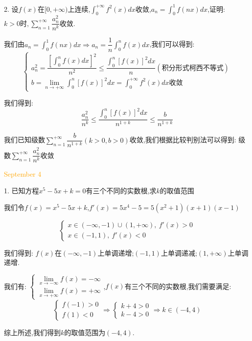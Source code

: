 2. 设$f(x)$在$[0,+\infty)$上连续,$\int_{0}^{+\infty}f^{2}(x)dx$收敛,$a_{n}=\int_{0}^{1}f(nx)dx$,证明:  $k>0\text{时},\sum\limits_{n=1}^{+\infty}\dfrac{a_{n}^2}{n^k}$收敛.
\begin{solution}

	我们由$a_{n}=\int_{0}^{1}f(nx)dx\Rightarrow a_{n}=\dfrac{1}{n}\int_{0}^{n}f(x)dx$,我们可以得到:  
	$$\left\lbrace
	\begin{array}{l}
		a_{n}^2=\dfrac{[\int_{0}^{n}f(x)dx]^2}{n^2}\leq \dfrac{\int_{0}^{n}[f(x)]^2dx}{n}(\text{积分形式柯西不等式})\\
		b=\lim\limits_{n\to+\infty}\int_{0}^{n}[f(x)]^2dx=\int_{0}^{+\infty}f^{2}(x)dx\text{收敛}
	\end{array}
	\right. $$
	
	我们得到:  $$\dfrac{a_{n}^2}{n^{k}}\leq \dfrac{\int_{0}^{n}[f(x)]^2dx}{n^{1+k}}\leq \dfrac{b}{n^{1+k}}$$
	
	我们已知级数$\sum\limits_{n=1}^{+\infty}\dfrac{b}{n^{1+k}}(k>0,b>0)$收敛,我们根据比较判别法可以得到:  级数$\sum\limits_{n=1}^{+\infty}\dfrac{a_{n}^2}{n^k}$收敛
\end{solution}

\textcolor{orange}{September 4}

1. 已知方程$x^5-5x+k=0$有三个不同的实数根,求$k$的取值范围
\begin{solution}

	我们令$f(x)=x^5-5x+k$,$f'(x)=5x^4-5=5(x^2+1)(x+1)(x-1)$
	
	$$\left\lbrace
	\begin{array}{l}
		x\in(-\infty,-1)\cup(1,+\infty),\ f'(x)>0\\
		x\in(-1,1),\ f'(x)<0
	\end{array}
	\right. $$
	
	我们得到:  $f(x)$在$(-\infty,-1)$上单调递增;$(-1,1)$上单调递减;$(1,+\infty)$上单调递增.
	
	我们有:  $\left\lbrace
	\begin{array}{l}
		\lim\limits_{x\to -\infty}f(x)=-\infty\\
		\lim\limits_{x\to +\infty}f(x)=+\infty
	\end{array}
	\right. $,$f(x)$有三个不同的实数根,我们需要满足:  
	$$\left\lbrace
	\begin{array}{l}
		f(-1)>0\\
		f(1)<0
	\end{array}
	\right. \Rightarrow \left\lbrace
	\begin{array}{l}
		k+4>0\\
		k-4>0
	\end{array}
	\right. \Rightarrow k\in(-4,4)$$
	
	综上所述,我们得到$k$的取值范围为$(-4,4)$.
\end{solution}

